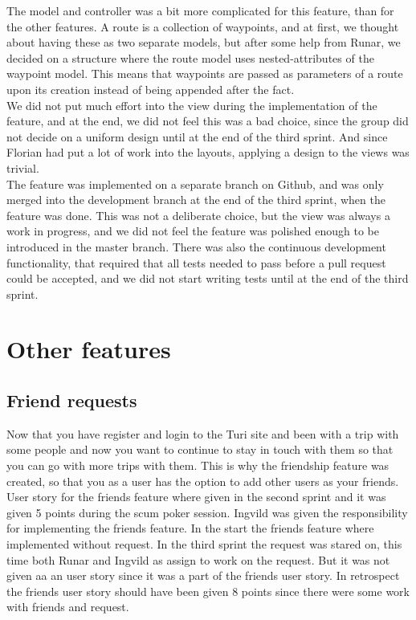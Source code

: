 \documentclass[a4paper]{article}
\begin{document}
\noindent
The model and controller was a bit more complicated for this feature, than for the other features. A route is a collection of waypoints, and at first, we thought about having these as two separate models,  but after some help from Runar, we decided on a structure where the route model uses nested-attributes of the waypoint model. This means that waypoints are passed as parameters of a route upon its creation instead of being appended after the fact. \\

\noindent
We did not put much effort into the view during the implementation of the feature, and at the end, we did not feel this was a bad choice, since the group did not decide on a uniform design until at the end of the third sprint. And since Florian had put a lot of work into the layouts, applying a design to the views was trivial. \\

\noindent
The feature was implemented on a separate branch on Github, and was only merged into the development branch at the end of the third sprint, when the feature was done. This was not a deliberate choice, but the view was always a work in progress, and we did not feel the feature was polished enough to be introduced in the master branch. There was also the continuous development functionality, that required that all tests needed to pass before a pull request could be accepted, and we did not start writing tests until at the end of the third sprint. \\

\section{Other features}
\subsection{Friend requests}
Now that you have register and login to the Turi site and been with a trip with some people and now you want to continue to stay in touch with them so that you can go with more trips with them. This is why the friendship feature was created, so that you as a user has the option to add other users as your friends. \\

\noindent
User story for the friends feature where given in the second sprint and it was given 5 points during the scum poker session. Ingvild was given the responsibility for implementing the friends feature. In the start the friends feature where implemented without request. In the third sprint the request was stared on, this time both Runar and Ingvild as assign to work on the request. But it was not given aa an user story since it was a part of the friends user story. In retrospect the friends user story should have been given 8 points since there were some work with friends and request. \\
\end{document}
